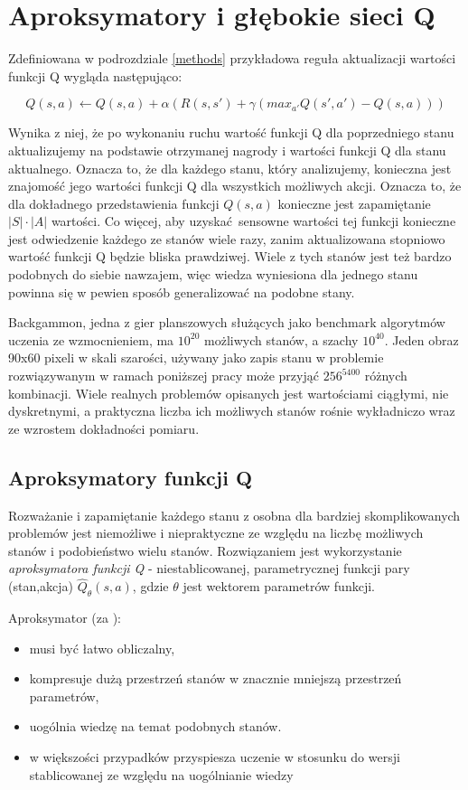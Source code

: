 \section{Aproksymatory i głębokie sieci Q}

Zdefiniowana w podrozdziale \ref{methods} przykładowa reguła aktualizacji wartości funkcji Q wygląda następująco:

$$Q(s,a) \leftarrow Q(s,a) + \alpha (R(s,s') + \gamma (max_{a'}Q(s',a') - Q (s,a)))$$

Wynika z niej, że po wykonaniu ruchu wartość funkcji Q dla poprzedniego stanu aktualizujemy na podstawie otrzymanej nagrody i wartości funkcji Q dla stanu aktualnego. Oznacza to, że dla każdego stanu, który analizujemy, konieczna jest znajomość jego wartości funkcji Q dla wszystkich możliwych akcji. Oznacza to, że dla dokładnego przedstawienia funkcji $Q(s,a)$  konieczne jest zapamiętanie $\left\vert{S}\right\vert \cdot \left\vert{A}\right\vert$ wartości. Co więcej, aby uzyskać sensowne wartości tej funkcji konieczne jest odwiedzenie każdego ze stanów wiele razy, zanim aktualizowana stopniowo wartość funkcji Q będzie bliska prawdziwej. Wiele z tych stanów jest też bardzo podobnych do siebie nawzajem, więc wiedza wyniesiona dla jednego stanu powinna się w pewien sposób generalizować na podobne stany.

Backgammon, jedna z gier planszowych służących jako benchmark algorytmów uczenia ze wzmocnieniem, ma $10^{20}$ możliwych stanów, a szachy $10^{40}$. Jeden obraz 90x60 pixeli w skali szarości, używany jako zapis stanu w problemie rozwiązywanym w ramach poniższej pracy może przyjąć $256^{5400}$ różnych kombinacji. Wiele realnych problemów opisanych jest wartościami ciągłymi, nie dyskretnymi, a praktyczna liczba ich możliwych stanów rośnie wykładniczo wraz ze wzrostem dokładności pomiaru.

\subsection{Aproksymatory funkcji Q}

Rozważanie i zapamiętanie każdego stanu z osobna dla bardziej skomplikowanych problemów jest niemożliwe i niepraktyczne ze względu na liczbę możliwych stanów i podobieństwo wielu stanów. Rozwiązaniem jest wykorzystanie \textit {aproksymatora funkcji Q} - niestablicowanej, parametrycznej funkcji pary (stan,akcja) $\hat{Q}_{\theta}(s,a)$, gdzie $\theta$ jest wektorem parametrów funkcji.


Aproksymator (za \cite{wjaskowski2016}):
\begin{itemize}
\item musi być łatwo obliczalny,
\item kompresuje dużą przestrzeń stanów w znacznie mniejszą przestrzeń parametrów,
\item uogólnia wiedzę na temat podobnych stanów.
\item w większości przypadków przyspiesza uczenie w stosunku do wersji stablicowanej ze względu na uogólnianie wiedzy
\end{itemize}


